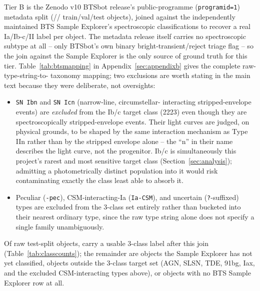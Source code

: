 Tier B is the Zenodo v10 BTSbot release's public-programme
(\texttt{programid=1}) metadata split (\TierBNObjTrain{}/\TierBNObjVal{}/%
\TierBNObjTest{} train/val/test objects), joined against the independently
maintained BTS Sample Explorer's spectroscopic classifications to recover a
real Ia/Ib-c/II label per object. The metadata release itself carries no
spectroscopic subtype at all -- only BTSbot's own binary
bright-transient/reject triage flag -- so the join against the Sample
Explorer is the only source of ground truth for this tier. Table~\ref{tab:btsmapping}
in Appendix~\ref{sec:appendixb} gives the complete raw-type-string-to-
taxonomy mapping; two exclusions are worth stating in the main text because
they were deliberate, not oversights:
\begin{itemize}
  \item \texttt{SN Ibn} and \texttt{SN Icn} (narrow-line, circumstellar-
    interacting stripped-envelope events) are \emph{excluded} from the
    Ib/c target class (2223) even though they are spectroscopically
    stripped-envelope events. Their light curves are judged, on physical
    grounds, to be shaped by the same interaction mechanism as Type IIn
    rather than by the stripped envelope alone -- the ``n'' in their name
    describes the light curve, not the progenitor. Ib/c is simultaneously
    this project's rarest and most sensitive target class
    (Section~\ref{sec:analysis}); admitting a photometrically distinct
    population into it would risk contaminating exactly the class least
    able to absorb it.
  \item Peculiar (\texttt{-pec}), CSM-interacting-Ia (\texttt{Ia-CSM}),
    and uncertain (\texttt{?}-suffixed) types are excluded from the
    3-class set entirely rather than bucketed into their nearest ordinary
    type, since the raw type string alone does not specify a single
    family unambiguously.
\end{itemize}
Of \TierBNObjTest{} raw test-split objects, \TierBLabeledTest{} carry a
usable 3-class label after this join (Table~\ref{tab:classcounts}); the
remainder are objects the Sample Explorer has not yet classified, objects
outside the 3-class target set (AGN, SLSN, TDE, 91bg, Iax, and the excluded
CSM-interacting types above), or objects with no BTS Sample Explorer row at
all.

